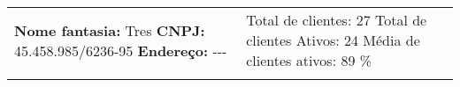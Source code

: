 \documentclass{article}%
\begin{document}
%
\pagestyle{empty}%
\normalsize%
\begin{tabu}{X[l] X[r]}%
\begin{minipage}[h]{0.49\textwidth}%
\textbf{Nome fantasia: }%
Tres%
\newline%
%
\textbf{CNPJ: }%
45.458.985/6236{-}95%
\newline%
%
\textbf{Endereço: }%
{-}{-}{-}%
\end{minipage}&\begin{minipage}[t!]{0.49\textwidth}%
\flushright%
Total de clientes: 27%
\linebreak%
Total de clientes Ativos: 24%
\linebreak%
Média de clientes ativos: 89 \% %
\linebreak%
\end{minipage}\\%
&\\%
\end{tabu}%
\pagestyle{firstpage}%
\renewcommand{\arraystretch}{1.5}%
\end{document}
